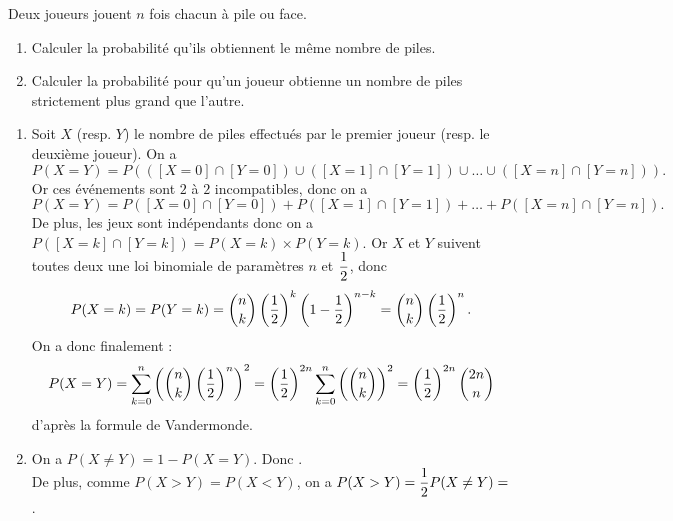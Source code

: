\documentclass[a4paper, 11pt,reqno]{article}
\begin{document}
\begin{exercice}  \;
	Deux joueurs jouent $n$ fois chacun \`a pile ou face.
	\begin{enumerate}
		\item Calculer la probabilit\'e qu'ils obtiennent le m\^eme nombre de piles.
		\item Calculer la probabilit\'e pour qu'un joueur obtienne un nombre de piles strictement plus grand que l'autre.
	\end{enumerate}
\end{exercice}
\begin{correction}  \;
	\begin{enumerate}
		\item Soit $X$ (resp. $Y$) le nombre de piles effectu\'es par le premier joueur (resp. le deuxi\`eme joueur). On a
		      $$P(X=Y) = P(([X=0]\cap[Y=0])\cup ([X=1]\cap[Y=1]) \cup \ldots \cup ([X=n]\cap[Y=n])).$$
		      Or ces \'ev\'enements sont $2$ \`a $2$ incompatibles, donc on a
		      $$P(X=Y) = P([X=0]\cap[Y=0]) + P([X=1]\cap[Y=1]) + \ldots + P([X=n]\cap[Y=n]).$$
		      De plus, les jeux sont ind\'ependants donc on a $P([X=k]\cap[Y=k]) = P(X=k) \times P(Y=k).$ Or $X$ et $Y$ suivent toutes deux une loi binomiale de param\`etres $n$ et $\displaystyle \frac{1}{2}$, donc
		      $$\displaystyle P(X=k) = P(Y=k) = \binom{n}{k} \displaystyle \left(\frac{1}{2}\right)^k \left(1-\frac{1}{2}\right)^{n-k} = \binom{n}{k} \displaystyle \left(\frac{1}{2}\right)^n.$$
		      On a donc finalement :
		      $$P(X=Y) =\displaystyle \sum\limits_{k=0}^n \left(\binom{n}{k} \left(\frac{1}{2}\right)^n\right)^2 = \left(\frac{1}{2}\right)^{2n}\sum\limits_{k=0}^n \left(\binom{n}{k}\right)^2 = \left(\frac{1}{2}\right)^{2n} \binom{2n}{n}$$
		      d'apr\`es la formule de Vandermonde.
		\item On a $P(X \not= Y) = 1-P(X=Y) $. Donc .\\
		      De plus, comme $P(X>Y) = P(X<Y)$, on a $P(X>Y) = \displaystyle \frac{1}{2} P(X\not=Y) =$ .

	\end{enumerate}
\end{correction}
\end{document}
